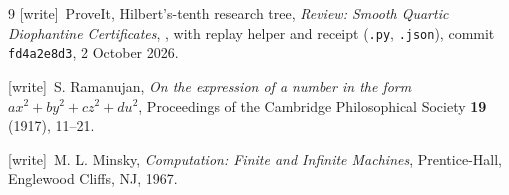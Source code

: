 \documentclass[11pt,a4paper]{article}
\theoremstyle{definition}
\theoremstyle{remark}
\newcommand{\wtag}{\textup{[write]}}
\begin{document}
\begin{thebibliography}{9}
\wtag\ ProveIt, Hilbert's-tenth research tree,
\emph{Review: Smooth Quartic Diophantine Certificates},
,
with replay helper and receipt (\texttt{.py}, \texttt{.json}), commit
\texttt{fd4a2e8d3}, 2 October 2026.

\wtag\ S. Ramanujan,
\emph{On the expression of a number in the form $ax^2+by^2+cz^2+du^2$},
Proceedings of the Cambridge Philosophical Society \textbf{19} (1917),
11--21.

\wtag\ M. L. Minsky,
\emph{Computation: Finite and Infinite Machines},
Prentice-Hall, Englewood Cliffs, NJ, 1967.

\end{thebibliography}
\end{document}
